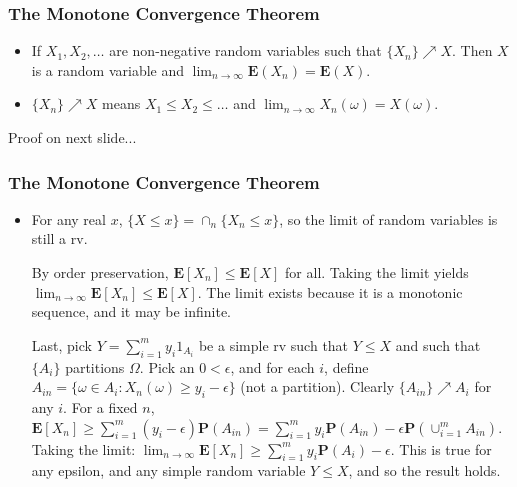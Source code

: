 \documentclass[handout]{beamer}
\newcommand{\BP}{\mathbf{P}}
\newcommand{\BE}{\mathbf{E}}
\begin{document}
\frame
{
  \frametitle{The Monotone Convergence Theorem}

\begin{itemize}

\item<1->[]
\begin{Theorem} 
If $X_1, X_2, \ldots$ are non-negative random variables such that $\{X_n\} \nearrow X$. Then $X$ is a random variable and $\lim_{n\rightarrow \infty} \BE(X_n)=\BE(X)$. 
\end{Theorem}

\item<2->[]
$\{X_n\} \nearrow X$ means $X_1 \le X_2 \le \ldots$ and $\lim_{n \to \infty} X_n(\omega) = X(\omega)$.

\end{itemize}

Proof on next slide...
}

\frame
{
  \frametitle{The Monotone Convergence Theorem}

\begin{itemize}

\item<1->[]
\begin{Proof} 
For any real $x$, $\{X \le x\} = \cap_n \{X_n \le x\}$, so the limit of random variables is still a rv. 
\newline

By order preservation, $\BE[X_n] \le \BE[X]$ for all. Taking the limit yields $\lim_{n \to \infty} \BE[X_n] \le \BE[X]$. The limit exists because it is a monotonic sequence, and it may be infinite.
\newline

Last, pick $Y = \sum_{i=1}^m y_i 1_{A_i}$ be a simple rv such that $Y \le X$ and such that $\{A_i\}$ partitions $\Omega$. Pick an $0 <\epsilon$, and for each $i$, define $A_{in} = \{\omega \in A_i : X_{n}(\omega) \ge y_i - \epsilon  \}$ (not a partition). Clearly $\{A_{in}\} \nearrow A_i$ for any $i$. For a fixed $n$, $\BE[X_n] \ge  \sum_{i=1}^m (y_i - \epsilon) \BP(A_{in}) = \sum_{i=1}^m y_i \BP(A_{in}) - \epsilon \BP(\cup_{i=1}^m A_{in})$. Taking the limit: $\lim_{n \to \infty} \BE[X_n] \ge \sum_{i=1}^m y_i \BP(A_{i}) - \epsilon$. This is true for any epsilon, and any simple random variable $Y \le X$, and so the result holds.

\end{Proof}

\end{itemize}
}
\end{document}
